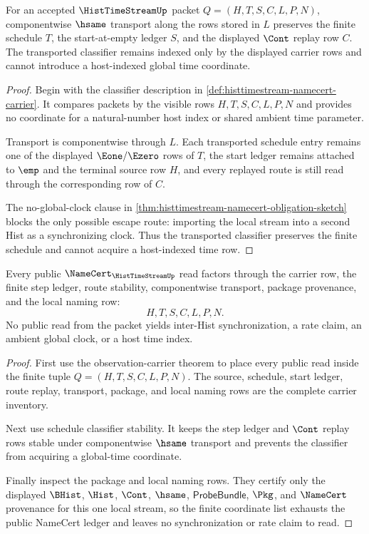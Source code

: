 \begin{theorem}
\label{thm:histtimestream-schedule-classifier-stability}
For an accepted $\HistTimeStreamUp$ packet $Q=(H,T,S,C,L,P,N)$, componentwise $\hsame$ transport along the rows stored in $L$ preserves the finite schedule $T$, the start-at-empty ledger $S$, and the displayed $\Cont$ replay row $C$. The transported classifier remains indexed only by the displayed carrier rows and cannot introduce a host-indexed global time coordinate.
\end{theorem}
\begin{proof}
Begin with the classifier description in \autoref{def:histtimestream-namecert-carrier}. It compares packets by the visible rows $H,T,S,C,L,P,N$ and provides no coordinate for a natural-number host index or shared ambient time parameter.

Transport is componentwise through $L$. Each transported schedule entry remains one of the displayed $\Eone/\Ezero$ rows of $T$, the start ledger remains attached to $\emp$ and the terminal source row $H$, and every replayed route is still read through the corresponding row of $C$.

The no-global-clock clause in \autoref{thm:histtimestream-namecert-obligation-sketch} blocks the only possible escape route: importing the local stream into a second Hist as a synchronizing clock. Thus the transported classifier preserves the finite schedule and cannot acquire a host-indexed time row.
\end{proof}

\begin{theorem}
\label{thm:histtimestream-namecert-ledger-exhaustion}
Every public $\NameCert_{\HistTimeStreamUp}$ read factors through the carrier row, the finite step ledger, route stability, componentwise transport, package provenance, and the local naming row:
$$
H,T,S,C,L,P,N.
$$
No public read from the packet yields inter-Hist synchronization, a rate claim, an ambient global clock, or a host time index.
\end{theorem}
\begin{proof}
First use the observation-carrier theorem to place every public read inside the finite tuple $Q=(H,T,S,C,L,P,N)$. The source, schedule, start ledger, route replay, transport, package, and local naming rows are the complete carrier inventory.

Next use schedule classifier stability. It keeps the step ledger and $\Cont$ replay rows stable under componentwise $\hsame$ transport and prevents the classifier from acquiring a global-time coordinate.

Finally inspect the package and local naming rows. They certify only the displayed $\BHist$, $\Hist$, $\Cont$, $\hsame$, $\mathsf{ProbeBundle}$, $\Pkg$, and $\NameCert$ provenance for this one local stream, so the finite coordinate list exhausts the public NameCert ledger and leaves no synchronization or rate claim to read.
\end{proof}

